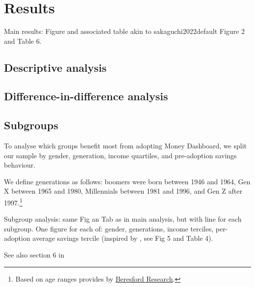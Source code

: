 
\section{Results}%
\label{sec:results}

Main results: Figure and associated table akin to sakaguchi2022default Figure 2
and Table 6.

\subsection{Descriptive analysis}%
\label{sub:descriptive_analysis}

\subsection{Difference-in-difference analysis}%
\label{sub:difference_in_difference_analysis}

\subsection{Subgroups}%
\label{sub:subgroups}

To analyse which groups benefit most from adopting Money Dashboard, we split
our sample by gender, generation, income quartiles, and pre-adoption savings
behaviour.

We define generations as follows: boomers were born between 1946 and 1964, Gen
X between 1965 and 1980, Millennials between 1981 and 1996, and Gen Z after
1997.\footnote{Based on age ranges provides by
    \href{https://www.beresfordresearch.com/age-range-by-generation/}{Beresford
Research}.}

Subgroup analysis: same Fig an Tab as in main analysis, but with line for each
subgroup. One figure for each of: gender, generations, income terciles,
per-adoption average savings tercile (inspired by \citet{carlin2017fintech},
see Fig 5 and Table 4).

See also section 6 in \citet{gargano2021goal}


